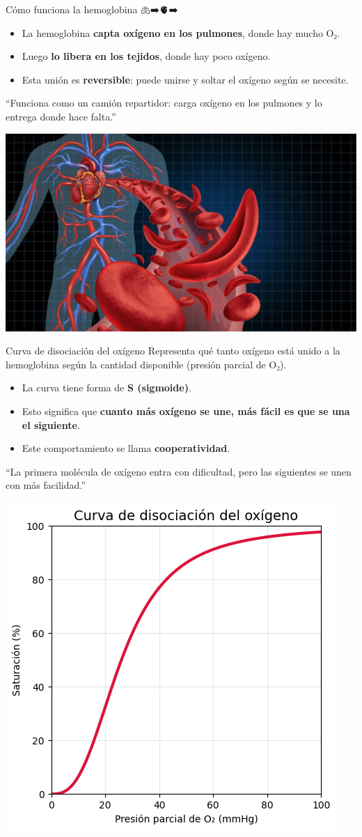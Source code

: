 \documentclass[
  ignorenonframetext,
]{beamer}
\providecommand{\tightlist}{%
  \setlength{\itemsep}{0pt}\setlength{\parskip}{0pt}}
\begin{document}
\begin{frame}{Cómo funciona la hemoglobina 🫁➡️🫀➡️🦵}
\label{cuxf3mo-funciona-la-hemoglobina}
\begin{itemize}
\tightlist
\item
  La hemoglobina \textbf{capta oxígeno en los pulmones}, donde hay mucho
  O₂.\\
\item
  Luego \textbf{lo libera en los tejidos}, donde hay poco oxígeno.\\
\item
  Esta unión es \textbf{reversible}: puede unirse y soltar el oxígeno
  según se necesite.
\end{itemize}

``Funciona como un camión repartidor: carga oxígeno en los pulmones y lo
entrega donde hace falta.''

\begin{center}
\includegraphics[width=0.45\linewidth,height=\textheight,keepaspectratio]{dispersion.png}
\end{center}
\end{frame}

\begin{frame}{Curva de disociación del oxígeno}
\label{curva-de-disociaciuxf3n-del-oxuxedgeno}
Representa qué tanto oxígeno está unido a la hemoglobina según la
cantidad disponible (presión parcial de O₂).

\begin{itemize}
\tightlist
\item
  La curva tiene forma de \textbf{S (sigmoide)}.\\
\item
  Esto significa que \textbf{cuanto más oxígeno se une, más fácil es que
  se una el siguiente}.\\
\item
  Este comportamiento se llama \textbf{cooperatividad}.
\end{itemize}

``La primera molécula de oxígeno entra con dificultad, pero las
siguientes se unen con más facilidad.''

\begin{center}
\includegraphics[width=0.3\linewidth,height=\textheight,keepaspectratio]{disociacion.png}
\end{center}
\end{frame}
\end{document}
